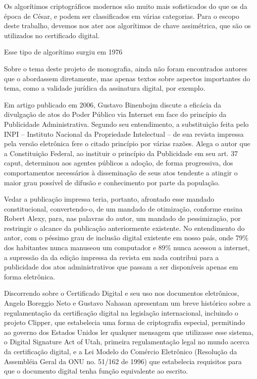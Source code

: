   Os algorítimos criptográficos modernos são muito mais
  sofisticados do que os da época de César, e podem ser
  classificados em várias categorias. Para o escopo deste
  trabalho, devemos nos ater aos algorítimos de chave
  assimétrica, que são os utilizados no certificado digital.\par

  Esse tipo de algorítimo surgiu em 1976
  


	Sobre o tema deste projeto de monografia, ainda não foram
  encontrados autores que o abordassem diretamente, mas apenas
  textos sobre aspectos importantes do tema, como a validade
  jurídica da assinatura digital, por exemplo.\par
	
	Em artigo publicado em 2006, Gustavo Binenbojm discute a
  eficácia da divulgação de atos do Poder Público via Internet em
  face do princípio da Publicidade Administrativa. Segundo seu
  entendimento, a substituição feita pelo INPI – Instituto
  Nacional da Propriedade Intelectual – de sua revista impressa
  pela versão eletrônica fere o citado princípio por várias
  razões. Alega o autor que a Constituição Federal, ao instituir
  o princípio da Publicidade em seu art. 37 caput, determinou aos
  agentes públicos a adoção, de forma progressiva, dos
  comportamentos necessários à disseminação de seus atos tendente
  a atingir o maior grau possível de difusão e conhecimento por
  parte da população. \par
	
	Vedar a publicação impressa teria, portanto, afrontado esse
  mandado constitucional, convertendo-o, de um mandado de
  otimização, conforme ensina Robert Alexy, para, nas palavras do
  autor, um mandado de pessimização, por restringir o alcance da
  publicação anteriormente existente.  No entendimento do autor,
  com o péssimo grau de inclusão digital existente em nosso país,
  onde 79\% dos habitantes nunca manuseou um computador e 89\%
  nunca acessou a internet, a supressão da da edição impressa da
  revista em nada contribui para a publicidade dos atos
  administrativos que passam a ser disponíveis apenas em forma
  eletrônica. \par
	
	Discorrendo sobre o Certificado Digital e seu uso nos
  documentos eletrônicos, Angelo Boreggio Neto e Gustavo Nahasan
  apresentam um breve histórico sobre a regulamentação da
  certificação digital na legislação internacional, incluindo o
  projeto Clipper, que estabelecia uma forma de criptografia
  especial, permitindo ao governo dos Estados Unidos ler qualquer
  mensagem que utilizasse esse sistema, o Digital Signature Act
  of Utah, primeira regulamentação legal no mundo acerca da
  certificação digital, e a Lei Modelo do Comércio Eletrônico
  (Resolução da Assembléia Geral da ONU no. 51/162 de 1996) que
  estabelecia requisitos para que o documento digital tenha
  função equivalente ao escrito. \par
	
